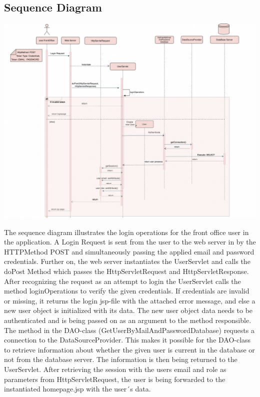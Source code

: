\subsection{Sequence Diagram}

\includegraphics[width=\textwidth]{images/SequenceDiagram_LoginUser.png}

The sequence diagram illustrates the login operations for the front office user in the application. A 
Login Request is sent from the user to the web server in by the HTTPMethod POST and simultaneously  passing the applied email and password credentials. Further on, the web server instantiates the UserServlet and calls the doPost Method which passes the HttpServletRequest and HttpServletResponse. After recognizing the request as an attempt to login the UserServlet calls the method loginOperations to verify the given credentials. If credentials are invalid or missing, it returns the login jsp-file with the attached error message, and else a new user object is initialized with its data. The new user object data needs to be authenticated and is being passed on as an argument to the method responsible. The method in the DAO-class (GetUserByMailAndPasswordDatabase) requests a connection to the DataSourceProvider. This makes it possible for the DAO-class to retrieve information about whether the given user is current in the database or not from the database server. The information is then being returned to the UserServlet. After retrieving the session with the users email and role as parameters from HttpServletRequest, the user is being forwarded to the instantiated homepage.jsp  with the user´s data. 

